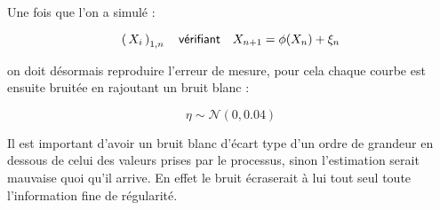 
Une fois que l'on a simulé :

\begin{equation*}
	\left( \, {X} _ {i} \, \right)_{1, n} \quad \textsf{vérifiant} \quad X_{n+1} = \phi(X_n) + \xi_n
\end{equation*}

on doit désormais reproduire l'erreur de mesure, pour cela chaque courbe est ensuite bruitée en rajoutant un bruit blanc :

\begin{equation*}
	\eta \sim \mathcal N ( 0, 0.04 )
\end{equation*}

Il est important d'avoir un bruit blanc d'écart type d'un ordre de grandeur en dessous de celui des valeurs prises par le processus, sinon l'estimation serait mauvaise quoi qu'il arrive. En effet le bruit écraserait à lui tout seul toute l'information fine de régularité.
